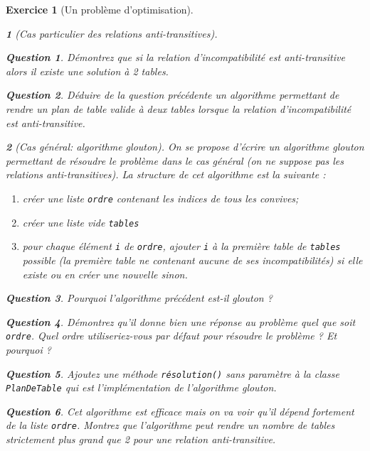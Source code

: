 \documentclass{article}
\theoremstyle{exostyle}
\newtheorem{exo}{Exercice}
\theoremstyle{partiestyle}
\newtheorem{partie}{}[exo]
\theoremstyle{questionstyle}
\newtheorem{questionpartie}{Question}[partie]
\begin{document}
\begin{exo}[Un problème d'optimisation]
\begin{partie}[Cas particulier des relations anti-transitives]
\begin{questionpartie}
Démontrez que si la relation d'incompatibilité est anti-transitive alors il existe une solution à 2 tables.
\end{questionpartie}

\begin{questionpartie}
Déduire de la question précédente un algorithme permettant de rendre un plan de table valide à deux tables lorsque la relation d'incompatibilité est anti-transitive.
\end{questionpartie}

\end{partie}

\begin{partie}[Cas général: algorithme glouton]

On se propose d'écrire un algorithme glouton permettant de résoudre le problème dans le cas général (on ne suppose pas les relations anti-transitives). La structure de cet algorithme est la suivante :

\begin{enumerate}
\item créer une liste \verb|ordre| contenant les indices de tous les convives;
\item créer une liste vide \verb|tables|
\item pour chaque élément \verb|i| de \verb|ordre|, ajouter \verb|i| à la première table de \verb|tables| possible (la première table ne contenant aucune de ses incompatibilités) si elle existe ou en créer une nouvelle sinon.
\end{enumerate}

\begin{questionpartie}   
Pourquoi l'algorithme précédent est-il glouton ?
\end{questionpartie}

\begin{questionpartie}
Démontrez qu'il donne bien une réponse au problème quel que soit \verb|ordre|. Quel ordre utiliseriez-vous par défaut pour résoudre le problème ? Et pourquoi ?
\end{questionpartie}

\begin{questionpartie}
Ajoutez une méthode \verb|résolution()| sans paramètre à la classe \verb+PlanDeTable+ qui est l'implémentation de l'algorithme glouton.
\end{questionpartie}

\begin{questionpartie}
Cet algorithme est efficace mais on va voir qu'il dépend fortement de la liste \verb|ordre|. Montrez que l'algorithme peut rendre un nombre de tables strictement plus grand que 2 pour une relation anti-transitive.
\end{questionpartie}


\end{partie}
\end{exo}
\end{document}
